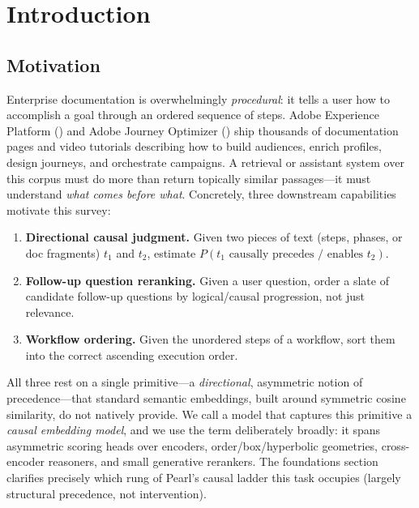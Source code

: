 \section{Introduction}

\subsection{Motivation}
Enterprise documentation is overwhelmingly \emph{procedural}: it tells a user how to
accomplish a goal through an ordered sequence of steps. Adobe Experience Platform
(\aep) and Adobe Journey Optimizer (\ajo) ship thousands of documentation pages and
video tutorials describing how to build audiences, enrich profiles, design journeys, and
orchestrate campaigns. A retrieval or assistant system over this corpus must do more than
return topically similar passages---it must understand \emph{what comes before what}.
Concretely, three downstream capabilities motivate this survey:

\begin{enumerate}[leftmargin=1.4em,itemsep=0.15em]
  \item \textbf{Directional causal judgment.} Given two pieces of text
  (steps, phases, or doc fragments) $t_1$ and $t_2$, estimate
  $P(t_1 \text{ causally precedes / enables } t_2)$.
  \item \textbf{Follow-up question reranking.} Given a user question, order a slate of
  candidate follow-up questions by logical/causal progression, not just relevance.
  \item \textbf{Workflow ordering.} Given the unordered steps of a workflow, sort them
  into the correct ascending execution order.
\end{enumerate}

All three rest on a single primitive---a \emph{directional}, asymmetric notion of
precedence---that standard semantic embeddings, built around symmetric cosine
similarity, do not natively provide. We call a model that captures this primitive a
\emph{causal embedding model}, and we use the term deliberately broadly: it spans
asymmetric scoring heads over encoders, order/box/hyperbolic geometries, cross-encoder
reasoners, and small generative rerankers. The foundations section clarifies precisely
which rung of Pearl's causal ladder this task occupies (largely structural precedence,
not intervention).

